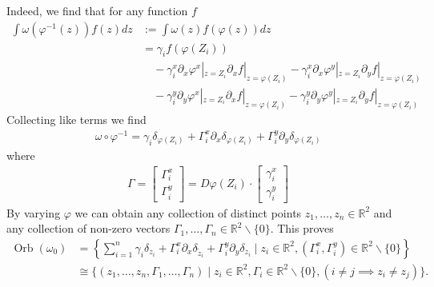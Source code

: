 \documentclass[12pt]{amsart}
\newcommand{\R}{\ensuremath{\mathbb{R}}}
\theoremstyle{remark}
\DeclareMathOperator{\Orb}{Orb}
\begin{document}
  Indeed, we find that for any function $f$
  \begin{align*}
    \int \omega \left(\varphi^{-1}(z)\right) f(z)dz &:= \int \omega (z)f\left(\varphi(z)\right) dz \\
    &= \gamma_i f(\varphi(Z_i)) \\
    &\quad - \gamma_i^x \partial_x \varphi^x|_{z=Z_i} \partial_x f |_{z=\varphi(Z_i)}
    - \gamma_i^x \partial_x \varphi^y|_{z=Z_i} \partial_y f |_{z=\varphi(Z_i)} \\
    &\quad - \gamma_i^y \partial_y \varphi^x|_{z=Z_i} \partial_x f |_{z=\varphi(Z_i)}
    - \gamma_i^y \partial_y \varphi^y|_{z=Z_i} \partial_y f |_{z=\varphi(Z_i)}
  \end{align*}
  Collecting like terms we find
  \begin{align*}
    \omega \circ \varphi^{-1} = \gamma_i \delta_{\varphi(Z_i)} + \Gamma_i^x \partial_x \delta_{\varphi(Z_i)} + \Gamma_i^y \partial_y \delta_{\varphi(Z_i)}
  \end{align*}
  where
  \begin{align*}
    \Gamma = 
    \begin{bmatrix}
      \Gamma_i^x \\ \Gamma_i^y 
    \end{bmatrix}
    =
    D\varphi(Z_i) \cdot
    \begin{bmatrix}
      \gamma_i^x \\ \gamma_i^y
    \end{bmatrix}
  \end{align*}
  By varying $\varphi$ we can obtain 
  any collection of distinct points $z_1,\dots,z_n \in \R^2$
  and any collection of non-zero vectors $\Gamma_1,\dots,\Gamma_n \in \R^2 \backslash \{0\}$.
  This proves
  \begin{align*}
  \Orb(\omega_0) &= \left\{ \sum_{i=1}^n \gamma_i \delta_{z_i} + \Gamma_i^x \partial_x \delta_{\tilde{z}_i} + \Gamma_i^y \partial_{y} \delta_{z_i}
  \mid z_i \in \R^2, (\Gamma_i^x,\Gamma_i^y) \in \R^2 \backslash \{0\} \right\} \\
  &\cong  \{ (z_1,\dots,z_n,\Gamma_1,\dots,\Gamma_n) \mid z_i \in \R^2, \Gamma_i \in \R^2 \backslash \{0\} , ( i \neq j \implies z_i \neq z_j ) \}.
  \end{align*}
  
\end{document}

